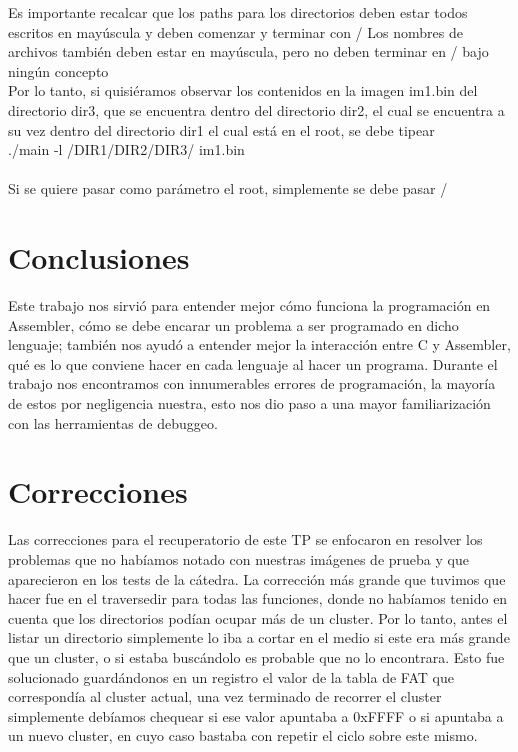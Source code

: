 \documentclass[a4paper,10pt]{article}
\begin{document}
Es importante recalcar que los paths para los directorios deben estar todos escritos en mayúscula y deben comenzar y terminar con /
Los nombres de archivos también deben estar en mayúscula, pero no deben terminar en / bajo ningún concepto \\
Por lo tanto, si quisiéramos observar los contenidos en la imagen im1.bin del directorio dir3, que se encuentra dentro del directorio dir2, el cual se encuentra a su vez dentro del directorio dir1 el cual está en el root, se debe tipear \\ ./main -l /DIR1/DIR2/DIR3/ im1.bin \\ \\
Si se quiere pasar como parámetro el root, simplemente se debe pasar /


\section{Conclusiones}

Este trabajo nos sirvió para entender mejor cómo funciona la programación en Assembler, cómo se debe encarar un problema a ser programado en dicho lenguaje; también nos ayudó a entender mejor la interacción entre C y Assembler, qué es lo que conviene hacer en cada lenguaje al hacer un programa. Durante el trabajo nos encontramos con innumerables errores de programación, la mayoría de estos por negligencia nuestra, esto nos dio paso a una mayor familiarización con las herramientas de debuggeo. 

\newpage

\section{Correcciones}

Las correcciones para el recuperatorio de este TP se enfocaron en resolver los problemas que no habíamos notado con nuestras imágenes de prueba y que aparecieron en los tests de la cátedra. La corrección más grande que tuvimos que hacer fue en el traversedir para todas las funciones, donde no habíamos tenido en cuenta que los directorios podían ocupar más de un cluster. Por lo tanto, antes el listar un directorio simplemente lo iba a cortar en el medio si este era más grande que un cluster, o si estaba buscándolo es probable que no lo encontrara. Esto fue solucionado guardándonos en un registro el valor de la tabla de FAT que correspondía al cluster actual, una vez terminado de recorrer el cluster simplemente debíamos chequear si ese valor apuntaba a 0xFFFF o si apuntaba a un nuevo cluster, en cuyo caso bastaba con repetir el ciclo sobre este mismo.
\end{document}
